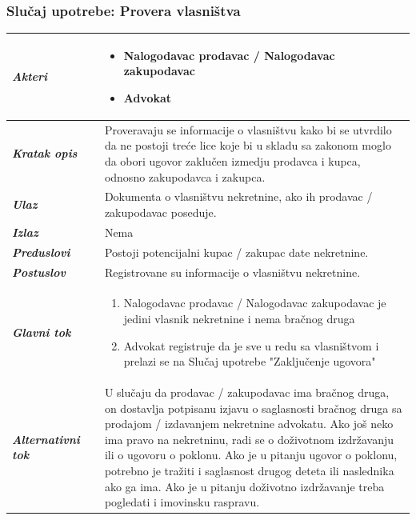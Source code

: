 \documentclass[20pt]{article}
\begin{document}
\subsubsection{\bfseries \large Slu\v{c}aj upotrebe: Provera vlasni\v stva}
\begin{center}
\begin{longtable}{p{0.23\linewidth} p{0.77\linewidth}}
 \hline
 {\it \bfseries Akteri} & \begin{itemize}
    \item Nalogodavac prodavac / Nalogodavac zakupodavac
    \item Advokat
\end{itemize}\\
\hline

 {\it \bfseries Kratak opis} & Proveravaju se informacije o vlasni\v stvu kako bi se utvrdilo da ne postoji tre\' ce lice koje bi u skladu sa zakonom moglo da obori ugovor zaklu\v cen izmedju prodavca i kupca, odnosno zakupodavca i zakupca.\\ 
 \hline
 
 {\it \bfseries Ulaz} & Dokumenta o vlasni\v stvu nekretnine, ako ih prodavac / zakupodavac poseduje.\\ 
 \hline
 
 {\it \bfseries Izlaz} & Nema\\
 \hline
 
 {\it \bfseries Preduslovi} & Postoji potencijalni kupac / zakupac date nekretnine.\\
 \hline

 {\it \bfseries Postuslov} & Registrovane su informacije o vlasni\v stvu nekretnine.\\
 \hline

     {\it \bfseries Glavni tok} &  
     \begin{enumerate}
        \item Nalogodavac prodavac / Nalogodavac zakupodavac je jedini vlasnik nekretnine i nema bra\v cnog druga
        \item Advokat registruje da je sve u redu sa vlasni\v stvom
        i prelazi se na Slu\v{c}aj upotrebe "Zaklju\v cenje ugovora"
    \end{enumerate}\\
 \hline
 {\it \bfseries Alternativni tok} & U slu\v caju da prodavac / zakupodavac ima bra\v cnog druga, on dostavlja potpisanu izjavu o saglasnosti bra\v cnog druga sa prodajom / izdavanjem nekretnine advokatu. Ako jo\v s neko ima pravo na nekretninu, radi se o do\v zivotnom izdr\v zavanju ili o ugovoru o poklonu. Ako je u pitanju ugovor o poklonu, potrebno je tra\v ziti i saglasnost drugog deteta ili naslednika ako ga ima. Ako je u pitanju do\v zivotno izdr\v zavanje treba pogledati i imovinsku raspravu. \\
 \hline
\end{longtable}
\end{center}
\end{document}
